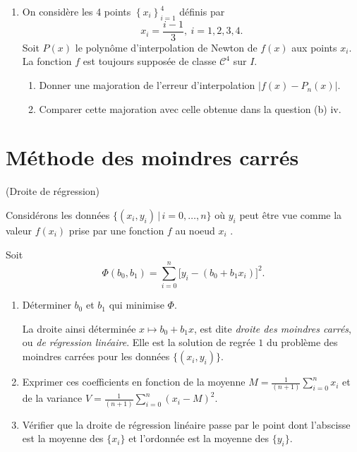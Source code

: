 \documentclass[a4paper,12pt,reqno]{amsart}
\begin{document}
\begin{exo}
\begin{enumerate}
\begin{enumerate}
$${          \cdots \left( x-\frac {n-1}{n}\right)\left( x-1\right)
        }\right|
        \leq \frac{1}{2^{n+1}} ,\quad \forall n \ge 1. )
      $$
    \end{enumerate}
    \item On considère les 4 points $\left\{x_i\right\}_{i=1}^4$ définis par
    $$
    x_i=\frac{i-1}{3}, \ i=1,2,3,4.
    $$
    Soit $P(x)$ le polynôme d'interpolation de Newton
    de $f(x)$ aux points $x_i$. La fonction $f$ est toujours supposée
    de classe ${\mathcal{C}}^4$ sur $I$.
    \begin{enumerate}
      \item Donner une majoration de l'erreur d'interpolation
      $|f(x)-P_n(x)|$.
      \item Comparer cette majoration avec celle obtenue dans la question
      (b) iv.
    \end{enumerate}
  \end{enumerate}
\end{exo}


\section{Méthode des moindres carrés}


\begin{exo} (Droite de régression)

  Considérons les données $\{(x_{i} ,y_{i}) \,|\, i = 0,\ldots,n\}$ où $y_{i}$ peut être vue comme la valeur $f(x_{i})$ prise par une fonction $f$ au noeud $x_{i}$ .

  Soit
    $$
      \Phi(b_{0} ,b_{1}) =
        \sum_{i=0}^{n} \big[y_{i} - (b_{0} + b_{1} x_{i})\big]^{2}.
    $$

  \begin{enumerate}
    \item Déterminer $b_{0}$ et $b_{1}$ qui minimise $\Phi$.

    La droite ainsi déterminée $x \mapsto b_{0} + b_{1} x$, est dite \emph{droite des moindres carrés}, ou \emph{de régression linéaire}. Elle est la solution de regrée $1$ du problème des moindres carrées pour les données $\{(x_{i} ,y_{i})\}$.

    \item Exprimer ces coefficients en fonction de la moyenne $M = \frac1{(n+1)} \sum_{i=0}^{n} x_{i}$  et de la variance $V = \frac1{(n+1)} \sum_{i=0}^{n} (x_{i}-M)^{2}$.
    \item  Vérifier que la droite de régression linéaire passe par le point dont l'abscisse est la moyenne des $\{x_{i}\}$ et l'ordonnée est la moyenne des $\{y_{i}\}$.
  \end{enumerate}


\end{exo}
\end{document}
